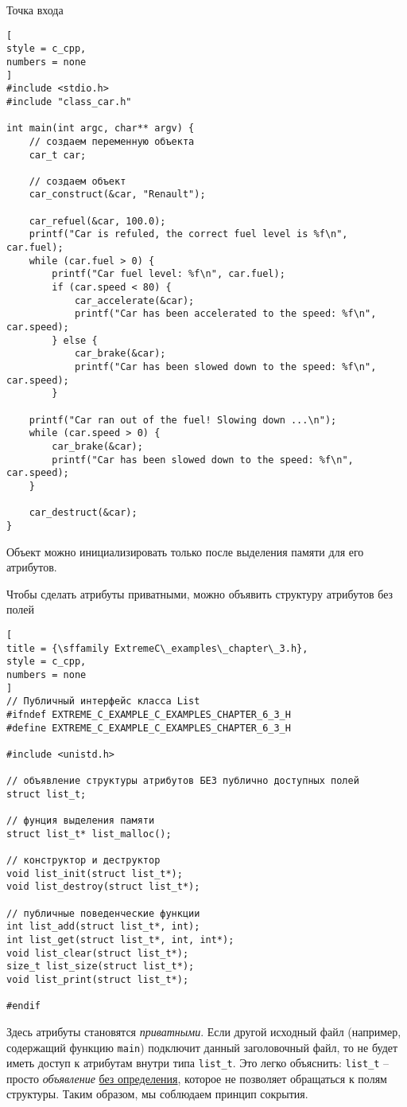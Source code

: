\documentclass[%
	11pt,
	a4paper,
	utf8,
		]{article}
\begin{document}
Точка входа
\begin{lstlisting}[
style = c_cpp,
numbers = none
]
#include <stdio.h>
#include "class_car.h"

int main(int argc, char** argv) {
    // создаем переменную объекта
    car_t car;
    
    // создаем объект
    car_construct(&car, "Renault");
    
    car_refuel(&car, 100.0);
    printf("Car is refuled, the correct fuel level is %f\n", car.fuel);
    while (car.fuel > 0) {
        printf("Car fuel level: %f\n", car.fuel);
        if (car.speed < 80) {
            car_accelerate(&car);
            printf("Car has been accelerated to the speed: %f\n", car.speed);
        } else {
            car_brake(&car);
            printf("Car has been slowed down to the speed: %f\n", car.speed);
        }
        
    printf("Car ran out of the fuel! Slowing down ...\n");
    while (car.speed > 0) {
        car_brake(&car);
        printf("Car has been slowed down to the speed: %f\n", car.speed);
    }
    
    car_destruct(&car);
}
\end{lstlisting}

Объект можно инициализировать только после выделения памяти для его атрибутов. 

Чтобы сделать атрибуты приватными, можно объявить структуру атрибутов без полей
\begin{lstlisting}[
title = {\sffamily ExtremeC\_examples\_chapter\_3.h},
style = c_cpp,
numbers = none
]
// Публичный интерфейс класса List
#ifndef EXTREME_C_EXAMPLE_C_EXAMPLES_CHAPTER_6_3_H
#define EXTREME_C_EXAMPLE_C_EXAMPLES_CHAPTER_6_3_H

#include <unistd.h>

// объявление структуры атрибутов БЕЗ публично доступных полей
struct list_t;

// фунция выделения памяти
struct list_t* list_malloc();

// конструктор и деструктор
void list_init(struct list_t*);
void list_destroy(struct list_t*);

// публичные поведенческие функции
int list_add(struct list_t*, int);
int list_get(struct list_t*, int, int*);
void list_clear(struct list_t*);
size_t list_size(struct list_t*);
void list_print(struct list_t*);

#endif
\end{lstlisting}

Здесь атрибуты становятся \emph{приватными}. Если другой исходный файл (например, содержащий функцию \verb|main|) подключит данный заголовочный файл, то не будет иметь доступ к атрибутам внутри типа \verb|list_t|. Это легко объяснить: \verb|list_t| -- просто \emph{объявление} \underline{без определения}, которое не позволяет обращаться к полям структуры. Таким образом, мы соблюдаем принцип сокрытия.
\end{document}
